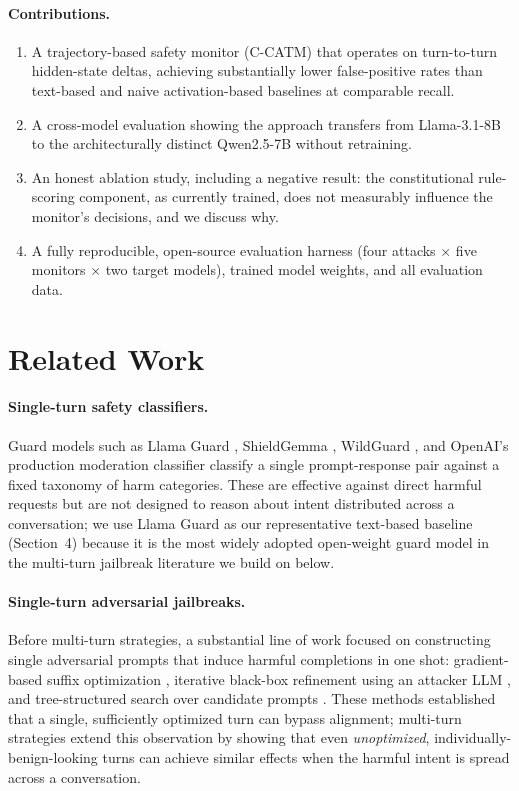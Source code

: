 \documentclass[11pt]{article}
\begin{document}
\paragraph{Contributions.}
\begin{enumerate}
    \item A trajectory-based safety monitor (C-CATM) that operates on turn-to-turn hidden-state deltas, achieving substantially lower false-positive rates than text-based and naive activation-based baselines at comparable recall.
    \item A cross-model evaluation showing the approach transfers from Llama-3.1-8B to the architecturally distinct Qwen2.5-7B without retraining.
    \item An honest ablation study, including a negative result: the constitutional rule-scoring component, as currently trained, does not measurably influence the monitor's decisions, and we discuss why.
    \item A fully reproducible, open-source evaluation harness (four attacks $\times$ five monitors $\times$ two target models), trained model weights, and all evaluation data.
\end{enumerate}

\section{Related Work}

\paragraph{Single-turn safety classifiers.} Guard models such as Llama Guard \citep{inan2023llamaguard}, ShieldGemma \citep{zeng2024shieldgemma}, WildGuard \citep{han2024wildguard}, and OpenAI's production moderation classifier \citep{markov2023moderation} classify a single prompt-response pair against a fixed taxonomy of harm categories. These are effective against direct harmful requests but are not designed to reason about intent distributed across a conversation; we use Llama Guard as our representative text-based baseline (Section~4) because it is the most widely adopted open-weight guard model in the multi-turn jailbreak literature we build on below.

\paragraph{Single-turn adversarial jailbreaks.} Before multi-turn strategies, a substantial line of work focused on constructing single adversarial prompts that induce harmful completions in one shot: gradient-based suffix optimization \citep{zou2023gcg}, iterative black-box refinement using an attacker LLM \citep{chao2023pair}, and tree-structured search over candidate prompts \citep{mehrotra2023tap}. These methods established that a single, sufficiently optimized turn can bypass alignment; multi-turn strategies extend this observation by showing that even \emph{unoptimized}, individually-benign-looking turns can achieve similar effects when the harmful intent is spread across a conversation.
\end{document}
